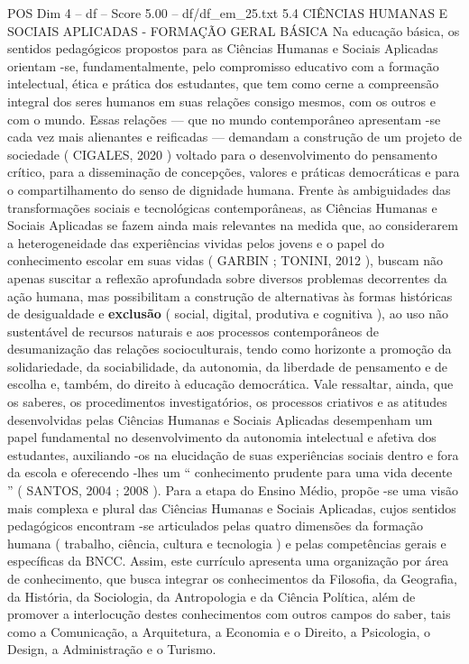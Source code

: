 \begin{textsample}{POS Dim 4 – df – Score 5.00 – df/df\_em\_25.txt}  \label{ex:f4_pos_230}
5.4 CIÊNCIAS HUMANAS E SOCIAIS APLICADAS - FORMAÇÃO GERAL BÁSICA Na educação básica, os sentidos pedagógicos propostos para as Ciências Humanas e Sociais Aplicadas orientam -se, fundamentalmente, pelo compromisso educativo com a formação intelectual, ética e prática dos estudantes, que tem como cerne a compreensão integral dos seres humanos em suas relações consigo mesmos, com os outros e com o mundo.
Essas relações — que no mundo contemporâneo apresentam -se cada vez mais alienantes e reificadas — demandam a construção de um projeto de sociedade ( CIGALES, 2020 ) voltado para o desenvolvimento do pensamento crítico, para a disseminação de concepções, valores e práticas democráticas e para o compartilhamento do senso de dignidade humana.
Frente às ambiguidades das transformações sociais e tecnológicas contemporâneas, as Ciências Humanas e Sociais Aplicadas se fazem ainda mais relevantes na medida que, ao considerarem a heterogeneidade das experiências vividas pelos jovens e o papel do conhecimento escolar em suas vidas ( GARBIN ; TONINI, 2012 ), buscam não apenas suscitar a reflexão aprofundada sobre diversos problemas decorrentes da ação humana, mas possibilitam a construção de alternativas às formas históricas de desigualdade e \textbf{exclusão} ( social, digital, produtiva e cognitiva ), ao uso não sustentável de recursos naturais e aos processos contemporâneos de desumanização das relações socioculturais, tendo como horizonte a promoção da solidariedade, da sociabilidade, da autonomia, da liberdade de pensamento e de escolha e, também, do direito à educação democrática.
Vale ressaltar, ainda, que os saberes, os procedimentos investigatórios, os processos criativos e as atitudes desenvolvidas pelas Ciências Humanas e Sociais Aplicadas desempenham um papel fundamental no desenvolvimento da autonomia intelectual e afetiva dos estudantes, auxiliando -os na elucidação de suas experiências sociais dentro e fora da escola e oferecendo -lhes um “ conhecimento prudente para uma vida decente ” ( SANTOS, 2004 ; 2008 ).
Para a etapa do Ensino Médio, propõe -se uma visão mais complexa e plural das Ciências Humanas e Sociais Aplicadas, cujos sentidos pedagógicos encontram -se articulados pelas quatro dimensões da formação humana ( trabalho, ciência, cultura e tecnologia ) e pelas competências gerais e específicas da BNCC.
Assim, este currículo apresenta uma organização por área de conhecimento, que busca integrar os conhecimentos da Filosofia, da Geografia, da História, da Sociologia, da Antropologia e da Ciência Política, além de promover a interlocução destes conhecimentos com outros campos do saber, tais como a Comunicação, a Arquitetura, a Economia e o Direito, a Psicologia, o Design, a Administração e o Turismo.

\end{textsample}
